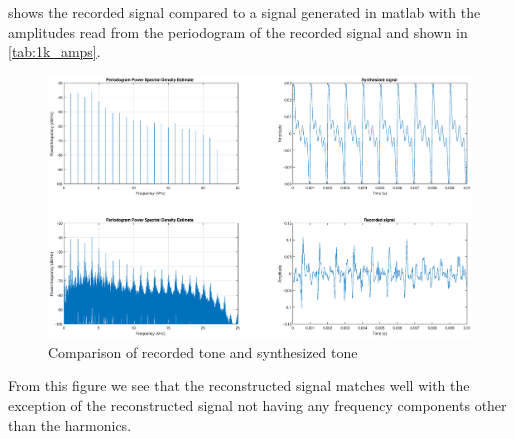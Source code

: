  shows the recorded signal compared to a signal generated in matlab with the amplitudes read from the periodogram of the recorded signal and shown in \cref{tab:1k_amps}.

\begin{figure}[H]
    \centering
    \includegraphics[trim={4cm 1.6cm 4cm 1.6cm},clip,width=\textwidth]{img/tones.eps}
    \caption{Comparison of recorded tone and synthesized tone}
    \label{fig:rectones}
\end{figure}

From this figure we see that the reconstructed signal matches well with the exception of the reconstructed signal not having any frequency components other than the harmonics.